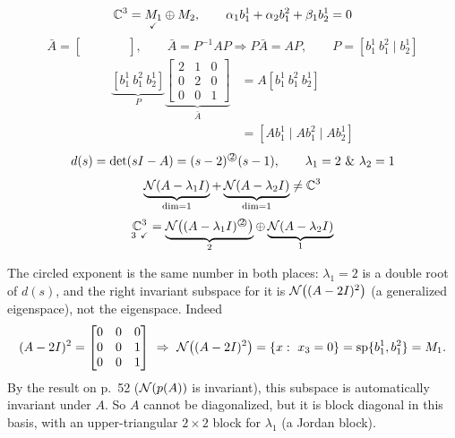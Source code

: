 \begin{example}
\[
\mathbb{C}^3=\underset{\checkmark}{M_1}\oplus M_2,\qquad
\alpha_1b_1^1+\alpha_2b_1^2+\beta_1b_2^1=0
\]
\[
\bar{A}=\left[\begin{array}{cc|c}\ \ &\ \ &\ \ \\ \ &\ &\ \\\hline\ &\ &\ \end{array}\right],
\qquad
\bar{A}=P^{-1}AP\Rightarrow P\bar{A}=AP,
\qquad
P=[b_1^1\ b_1^2\mid b_2^1]
\]
\begin{align*}
\underbrace{[b_1^1\ b_1^2\ b_2^1]}_{P}
\underbrace{\left[\begin{array}{cc|c}2&1&0\\0&2&0\\\hline0&0&1\end{array}\right]}_{\bar{A}}
&=A[b_1^1\ b_1^2\ b_2^1]\\
&=[Ab_1^1\mid Ab_1^2\mid Ab_2^1]
\end{align*}
\[
d(s)=\det(sI-A)=(s-2)^{\text{\textcircled{\scriptsize 2}}}(s-1),\qquad\lambda_1=2\ \&\ \lambda_2=1
\]
\[
\underbrace{\mathcal{N}(A-\lambda_1I)}_{\dim=1}+\underbrace{\mathcal{N}(A-\lambda_2I)}_{\dim=1}\neq\mathbb{C}^3
\]
\[
\underset{3\ \checkmark}{\C^3}=\underbrace{\Null\big((A-\lambda_1I)^{\text{\textcircled{\scriptsize 2}}}\big)}_{2}\oplus\underbrace{\Null(A-\lambda_2I)}_{1}
\]
\begin{insight}
The circled exponent is the same number in both places: $\lambda_1=2$ is a double root of $d(s)$, and the right invariant subspace for it is $\mathcal{N}\big((A-2I)^2\big)$ (a generalized eigenspace), not the eigenspace. Indeed
\[
(A-2I)^2=\bmat{0&0&0\\0&0&1\\0&0&1}\ \Rightarrow\ \Null\big((A-2I)^2\big)=\{x:\ x_3=0\}=\Span\{b_1^1,b_1^2\}=M_1 .
\]
By the result on p.~52 ($\mathcal{N}(p(A))$ is invariant), this subspace is automatically invariant under $A$. So $A$ cannot be diagonalized, but it is block diagonal in this basis, with an upper-triangular $2\times2$ block for $\lambda_1$ (a Jordan block).
\end{insight}
\end{example}

